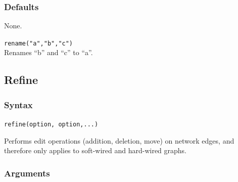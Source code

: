 	\subsubsection{Defaults}
		None.
		
	\begin{example}
	
		\item{\texttt{rename("a","b","c")}\\ Renames ``b'' and ``c'' to ``a''. }
				
	\end{example}

\subsection{Refine}
	\subsubsection{Syntax}
		\texttt{refine(option, option,...)}
		
	\begin{phygdescription}
		{Performs edit operations (addition, deletion, move) on network edges, and therefore
		only applies to soft-wired and hard-wired graphs.}
	\end{phygdescription}

	\subsubsection{Arguments}
		
